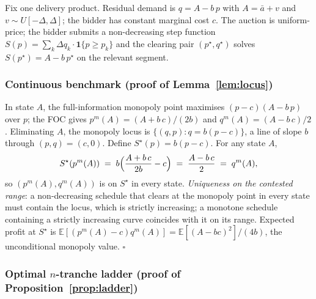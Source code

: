 \documentclass[11pt,a4paper]{article}
\theoremstyle{definition}
\theoremstyle{remark}
\theoremstyle{plain}
\begin{document}
Fix one delivery product. Residual demand is $q = A - b\,p$ with $A = \bar a + v$ and $v \sim U[-\Delta, \Delta]$; the bidder has constant marginal cost $c$. The auction is uniform-price; the bidder submits a non-decreasing step function $S(p) = \sum_k \Delta q_k \cdot \mathbf{1}\{p \ge p_k\}$ and the clearing pair $(p^\star, q^\star)$ solves $S(p^\star) = A - b\,p^\star$ on the relevant segment.

\subsubsection{Continuous benchmark (proof of Lemma~\ref{lem:locus})}\label{sec:tranche-app:locus}

In state $A$, the full-information monopoly point maximises $(p - c)(A - b\,p)$ over $p$; the FOC gives $p^m(A) = (A + b\,c)/(2 b)$ and $q^m(A) = (A - b\,c)/2$. Eliminating $A$, the monopoly locus is $\{(q, p) : q = b(p - c)\}$, a line of slope $b$ through $(p, q) = (c, 0)$. Define $S^\star(p) = b(p - c)$. For any state $A$,
\[
S^\star(p^m(A)) \;=\; b\Bigl(\frac{A + b\,c}{2 b} - c\Bigr) \;=\; \frac{A - b\,c}{2} \;=\; q^m(A),
\]
so $(p^m(A), q^m(A))$ is on $S^\star$ in every state. \emph{Uniqueness on the contested range}: a non-decreasing schedule that clears at the monopoly point in every state must contain the locus, which is strictly increasing; a monotone schedule containing a strictly increasing curve coincides with it on its range. Expected profit at $S^\star$ is $\mathbb{E}[(p^m(A) - c) q^m(A)] = \mathbb{E}[(A - b c)^2]/(4 b)$, the unconditional monopoly value. $\square$

\subsubsection{Optimal $n$-tranche ladder (proof of Proposition~\ref{prop:ladder})}\label{sec:tranche-app:quantizer}
\end{document}
